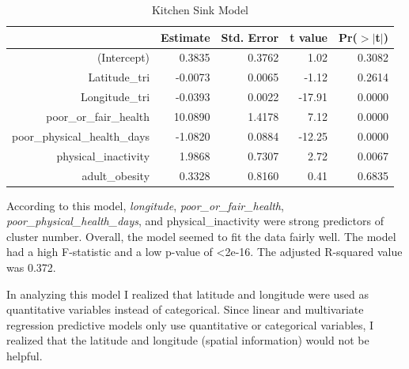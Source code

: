 \documentclass[12pt,twoside]{amherstthesis}
\begin{document}
  \begin{Shaded}
  \begin{Highlighting}[]
  \StringTok{ }\OperatorTok{~}
  \end{Highlighting}
  \end{Shaded}
  
  \begin{table}[ht]
  \centering
  \begin{tabular}{rrrrr}
    \hline
   & Estimate & Std. Error & t value & Pr($>$$|$t$|$) \\ 
    \hline
  (Intercept) & 0.3835 & 0.3762 & 1.02 & 0.3082 \\ 
    Latitude\_tri & -0.0073 & 0.0065 & -1.12 & 0.2614 \\ 
    Longitude\_tri & -0.0393 & 0.0022 & -17.91 & 0.0000 \\ 
    poor\_or\_fair\_health & 10.0890 & 1.4178 & 7.12 & 0.0000 \\ 
    poor\_physical\_health\_days & -1.0820 & 0.0884 & -12.25 & 0.0000 \\ 
    physical\_inactivity & 1.9868 & 0.7307 & 2.72 & 0.0067 \\ 
    adult\_obesity & 0.3328 & 0.8160 & 0.41 & 0.6835 \\ 
     \hline
  \end{tabular}
  \caption{Kitchen Sink Model} 
  \end{table}
  
  According to this model, \emph{longitude},
  \emph{poor\_or\_fair\_health}, \emph{poor\_physical\_health\_days}, and
  physical\_inactivity were strong predictors of cluster number. Overall,
  the model seemed to fit the data fairly well. The model had a high
  F-statistic and a low p-value of \textless{}2e-16. The adjusted
  R-squared value was 0.372.
  
  In analyzing this model I realized that latitude and longitude were used
  as quantitative variables instead of categorical. Since linear and
  multivariate regression predictive models only use quantitative or
  categorical variables, I realized that the latitude and longitude
  (spatial information) would not be helpful.
  
  \begin{Shaded}
  \end{Shaded}
  
\end{document}
